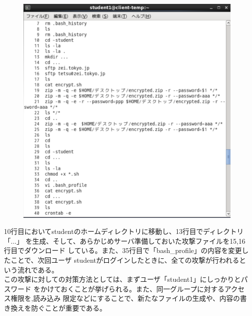 \documentclass[dvipdfmx,autodetect-engine,titlepage]{jsarticle}
\begin{document}
\begin{figure}[h]
  \centering
  \includegraphics[scale=0.6]{pic13.png}
  \caption{}
\end{figure}

10行目においてstudentのホームディレクトリに移動し、13行目でディレクトリ「...」
を生成、そして、あらかじめサーバ準備しておいた攻撃ファイルを15,16行目でダウンロード
している。また、35行目で「bash\_profile」の内容を変更したことで、次回ユーザ
studentがログインしたときに、全ての攻撃が行われるという流れである。\\
この攻撃に対しての対策方法としては、まずユーザ「student1」にしっかりとパスワード
をかけておくことが挙げられる。また、同一グループに対するアクセス権限を,読み込み
限定などにすることで、新たなファイルの生成や、内容の書き換えを防ぐことが重要である。
\end{document}
